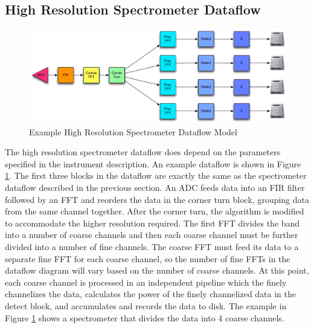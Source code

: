 \subsection{High Resolution Spectrometer Dataflow}

\begin{figure}[ht!]
  \centering
    \includegraphics[width=1\textwidth]{Images/C4/hires_spectrometer_dataflow.pdf}
  \caption[Example High Resolution Spectrometer Dataflow Model]{Example High Resolution Spectrometer Dataflow Model
  }

  \label{fig: C4/hires_spectrometer_dataflow.pdf}
\end{figure}

The high resolution spectrometer dataflow does depend on the parameters specified in the instrument description. 
An example dataflow is shown in Figure \ref{fig: C4/hires_spectrometer_dataflow.pdf}. 
The first three blocks in the dataflow are exactly the same as the spectrometer dataflow described in the previous section. 
An ADC feeds data into an FIR filter followed by an FFT and reorders the data in the corner turn block, grouping data from the same channel together. 
After the corner turn, the algorithm is modified to accommodate the higher resolution required. 
The first FFT divides the band into a number of coarse channels and then each coarse channel must be further divided into a number of fine channels. 
The coarse FFT must feed its data to a separate fine FFT for each coarse channel, so the number of fine FFTs in the dataflow diagram will vary based on the number of coarse channels.
At this point, each coarse channel is processed in an independent pipeline which the finely channelizes the data, calculates the power of the finely channelized data in the detect block, and accumulates and records the data to disk. 
The example in Figure \ref{fig: C4/hires_spectrometer_dataflow.pdf} shows a spectrometer that divides the data into 4 coarse channels.

